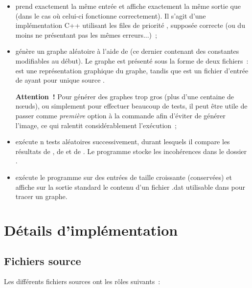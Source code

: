 \documentclass[12p0t,a4paper]{article}
\begin{document}
\begin{itemize}
\item {} prend exactement la même entrée et affiche exactement la même sortie que  (dans le cas où celui-ci fonctionne correctement). Il s'agit d'une implémentation C++ utilisant les files de priorité , supposée correcte (ou du moins ne présentant pas les mêmes erreurs...)~;
\item {} génère un graphe aléatoire à l'aide de  (ce dernier contenant des constantes modifiables au début). Le graphe est présenté sous la forme de deux fichiers~:  est une représentation graphique du graphe, tandis que  est un fichier d'entrée de  ayant pour unique source .

\textbf{Attention~!} Pour générer des graphes trop gros (plus d'une centaine de nœuds), ou simplement pour effectuer beaucoup de tests, il peut être utile de passer  comme \emph{première} option à la commande afin d'éviter de générer l'image, ce qui ralentit considérablement l'exécution~;
\item {} exécute n tests aléatoires successivement, durant lesquels il compare les résultats de , de  et de . Le programme stocke les incohérences dans le dossier .

\item {} exécute le programme sur des entrées de taille croissante (conservées) et affiche sur la sortie standard le contenu d'un fichier .dat utilisable dans  pour tracer un graphe.
\end{itemize}

\section{Détails d'implémentation}

\subsection{Fichiers source}

Les différents fichiers sources ont les rôles suivants~:
\end{document}
